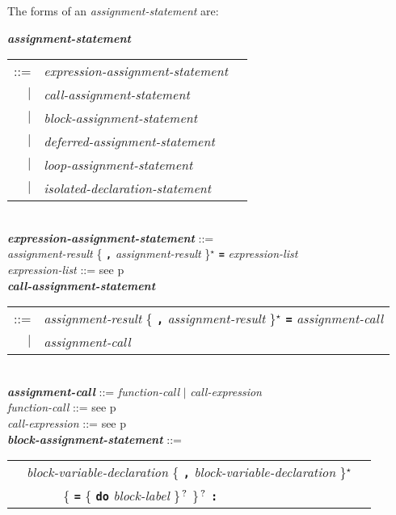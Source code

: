 \documentclass[12pt]{article}
\newcommand{\TT}[1]{{\tt \bfseries #1}}
\newcommand{\STAR}{{\Large $^\star$}}
\newcommand{\QMARK}{{$^{\,\mbox{\footnotesize ?}}$}}
\newcommand{\ttkey}[1]{{\tt \bfseries #1}}
\newcommand{\emkey}[1]{{\em \bfseries #1}}
\newcommand{\pagref}[1]{p\pageref{#1}}
\newenvironment{indpar}[1][0.3in]%
	{\begin{list}{}%
		     {\setlength{\itemsep}{0in}%
		      \setlength{\topsep}{0in}%
		      \setlength{\parsep}{1ex}%
		      \setlength{\labelwidth}{#1}%
		      \setlength{\leftmargin}{#1}%
		      \addtolength{\leftmargin}{\labelsep}}%
	 \item}%
	{\end{list}}
\begin{document}
The forms of an {\em assignment-statement} are:
\begin{indpar}
\emkey{assignment-statement}
    \begin{tabular}[t]{@{}rll}
    ::= & {\em expression-assignment-statement} \\
    $|$ & {\em call-assignment-statement} \\
    $|$ & {\em block-assignment-statement} \\
    $|$ & {\em deferred-assignment-statement} \\
    $|$ & {\em loop-assignment-statement} \\
    $|$ & {\em isolated-declaration-statement} \\
    \end{tabular}
\\[0.5ex]
\emkey{expression-assignment-statement} ::= \\
\hspace*{0.5in} {\em assignment-result}
                \{ \TT{,} {\em assignment-result} \}\STAR{}
		\TT{=} {\em expression-list}
\\[0.5ex]
{\em expression-list} ::= see \pagref{EXPRESSION-LIST}
\\[0.5ex]
\emkey{call-assignment-statement} \\
\hspace*{0.5in} \begin{tabular}{rl}
                ::= & {\em assignment-result}
                      \{ \TT{,} {\em assignment-result} \}\STAR{}
		      \TT{=} {\em assignment-call} \\
		$|$ & {\em assignment-call}
		\end{tabular}
\\[0.5ex]
\emkey{assignment-call} ::= {\em function-call} $|$
                            {\em call-expression}
\\[0.5ex]
{\em function-call} ::= see \pagref{FUNCTION-CALL}
\\[0.5ex]
{\em call-expression} ::= see \pagref{CALL-EXPRESSION}
\\[0.5ex]
\emkey{block-assignment-statement} ::= \\
\hspace*{0.5in}
    \begin{tabular}[t]{@{}rll}
        & {\em block-variable-declaration}
                \{ \TT{,} {\em block-variable-declaration} \}\STAR{} \\
	& ~~~~~ \{ \TT{=} \{ \ttkey{do} {\em block-label} \}\QMARK{} \}\QMARK{}
		   \TT{:} \\

\end{tabular}
\end{indpar}
\end{document}
